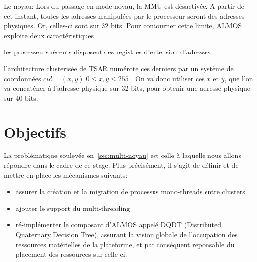       \begin{paragraph}{Le noyau:}
        Lors du passage en mode noyau, la MMU est désactivée. A partir de cet
        instant, toutes les adresses manipulées par le processeur seront des
        adresses physiques. Or, celles-ci sont sur 32 bits. Pour contourner
        cette limite, ALMOS exploite deux caractéristiques \benumline \item les
        processeurs récents disposent des registres d'extension d'adresses \item
        l'architecture clusterisée de TSAR numérote ces derniers par un système
        de coordonnées $cid = (x, y) | 0 \leq x,y \leq 255$ \eenumline. On va
        donc utiliser ces $x$ et $y$, que l'on va concaténer à l'adresse
        physique sur 32 bits, pour obtenir une adresse physique sur 40 bits.
      \end{paragraph}

      
  \section{Objectifs}

    La problématique soulevée en~\ref{sec:multi-noyau} est celle à laquelle nous
    allons répondre dans le cadre de ce stage. Plus précisément, il s'agit de
    définir et de mettre en place les mécanismes suivants:
    
    \begin{itemize}
      \item assurer la création et la migration de processus mono-threads entre
        clusters
      \item ajouter le support du multi-threading
      \item ré-implémenter le composant d'ALMOS appelé DQDT (Distributed
        Quaternary Decision Tree), assurant la vision globale de l'occupation
        des ressources matérielles de la plateforme, et par conséquent
        reponsable du placement des ressources sur celle-ci.
    \end{itemize}
